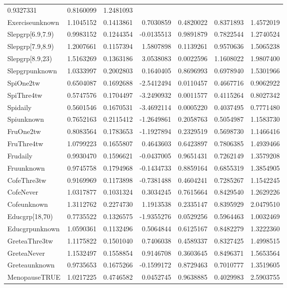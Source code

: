 \documentclass[]{article}
\begin{document}
\begin{longtable}[]{@{}lrrrrrr@{}}
0.9327331 & 0.8160099 & 1.2481093\tabularnewline
Exerciseunknown & 1.1045152 & 0.1413861 & 0.7030859 & 0.4820022 &
0.8371893 & 1.4572019\tabularnewline
Slepgrp{[}6.9,7.9) & 0.9983152 & 0.1244354 & -0.0135513 & 0.9891879 &
0.7822544 & 1.2740524\tabularnewline
Slepgrp{[}7.9,8.9) & 1.2007661 & 0.1157394 & 1.5807898 & 0.1139261 &
0.9570636 & 1.5065238\tabularnewline
Slepgrp{[}8.9,23) & 1.5163269 & 0.1363186 & 3.0538083 & 0.0022596 &
1.1608022 & 1.9807400\tabularnewline
Slepgrpunknown & 1.0333997 & 0.2002803 & 0.1640405 & 0.8696993 &
0.6978940 & 1.5301966\tabularnewline
SpiOne2tw & 0.6504087 & 0.1692688 & -2.5412494 & 0.0110457 & 0.4667716 &
0.9062922\tabularnewline
SpiThre4tw & 0.5747576 & 0.1704497 & -3.2490932 & 0.0011577 & 0.4115264
& 0.8027342\tabularnewline
Spidaily & 0.5601546 & 0.1670531 & -3.4692114 & 0.0005220 & 0.4037495 &
0.7771480\tabularnewline
Spiunknown & 0.7652163 & 0.2115412 & -1.2649861 & 0.2058763 & 0.5054987
& 1.1583730\tabularnewline
FruOne2tw & 0.8083564 & 0.1783653 & -1.1927894 & 0.2329519 & 0.5698730 &
1.1466416\tabularnewline
FruThre4tw & 1.0799223 & 0.1655807 & 0.4643603 & 0.6423897 & 0.7806385 &
1.4939466\tabularnewline
Frudaily & 0.9930470 & 0.1596621 & -0.0437005 & 0.9651431 & 0.7262149 &
1.3579208\tabularnewline
Fruunknown & 0.9745758 & 0.1794968 & -0.1434733 & 0.8859164 & 0.6855319
& 1.3854905\tabularnewline
CofeThre3tw & 0.9169969 & 0.1173898 & -0.7381488 & 0.4604241 & 0.7285267
& 1.1542245\tabularnewline
CofeNever & 1.0317877 & 0.1031324 & 0.3034245 & 0.7615664 & 0.8429540 &
1.2629226\tabularnewline
Cofeunknown & 1.3112762 & 0.2274730 & 1.1913538 & 0.2335147 & 0.8395929
& 2.0479510\tabularnewline
Educgrp{[}18,70) & 0.7735522 & 0.1326575 & -1.9355276 & 0.0529256 &
0.5964463 & 1.0032469\tabularnewline
Educgrpunknown & 1.0590361 & 0.1132496 & 0.5064844 & 0.6125167 &
0.8482279 & 1.3222360\tabularnewline
GreteaThre3tw & 1.1175822 & 0.1501040 & 0.7406038 & 0.4589337 &
0.8327425 & 1.4998515\tabularnewline
GreteaNever & 1.1532497 & 0.1558854 & 0.9146708 & 0.3603645 & 0.8496371
& 1.5653564\tabularnewline
Greteaunknown & 0.9735653 & 0.1675266 & -0.1599172 & 0.8729463 &
0.7010777 & 1.3519605\tabularnewline
MenopauseTRUE & 1.0217225 & 0.4746582 & 0.0452745 & 0.9638885 &
0.4029983 & 2.5903755\tabularnewline
\bottomrule
\end{longtable}
\end{document}
